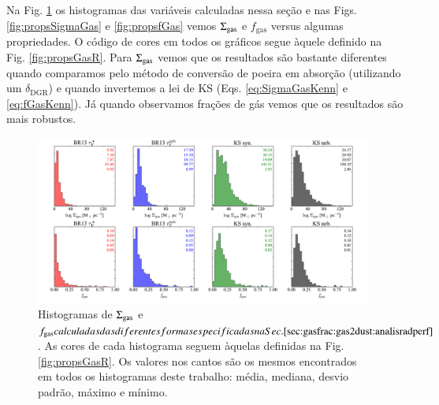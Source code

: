 Na Fig. \ref{fig:histoGas} os histogramas das variáveis calculadas nessa seção e nas Figs.
\ref{fig:propsSigmaGas} e \ref{fig:propsfGas} vemos $\SigmaGas$ e $f_{\mathrm{gas}}$ versus algumas
propriedades. O código de cores em todos os gráficos segue àquele definido na Fig.
\ref{fig:propsGasR}. Para $\SigmaGas$ vemos que os resultados são bastante diferentes quando
comparamos pelo método de conversão de poeira em absorção (utilizando um $\delta_{\mathrm{DGR}}$) e
quando invertemos a lei de KS (Eqs. \ref{eq:SigmaGasKenn} e \ref{eq:fGasKenn}). Já quando observamos
frações de gás vemos que os resultados são mais robustos. 

\begin{figure}
	\centering
	\includegraphics[width=0.99\textwidth]{figuras/histo_gas_R.pdf}
	\caption[Histogramas de $\SigmaGas$ e $f_{\mathrm{gas}}$.]
	{Histogramas de $\SigmaGas$ e $f_{\mathrm{gas}} calculadas das diferentes formas especificadas
na Sec. \ref{sec:gasfrac:gas2dust:analisradperf}$. As cores de cada histograma seguem àquelas
definidas na Fig. \ref{fig:propsGasR}. Os valores nos cantos são os mesmos encontrados em todos os
histogramas deste trabalho: média, mediana, desvio padrão, máximo e mínimo.}
	\label{fig:histoGas}
\end{figure}

